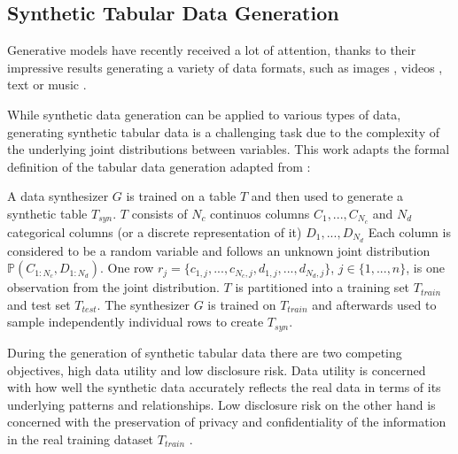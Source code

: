 \subsection{Synthetic Tabular Data Generation}
\label{sec: synthetic tabular data generation}

Generative models have recently received a lot of attention, thanks to their impressive results generating a variety of data formats, 
such as images \cite{ho2020DenoisingDiffusionProbabilistic, dhariwal2021DiffusionModelsBeat, rombach2022HighResolutionImageSynthesis}, videos \cite{ho2022VideoDiffusionModels, Gen1Runway}, text \cite{radfordImprovingLanguageUnderstanding, 2022ChatGPTOptimizingLanguage} or music \cite{agostinelli2023MusicLMGeneratingMusic, martirosRiffusion}.

While synthetic data generation can be applied to various types of data, generating synthetic tabular data is a challenging task due to the complexity of the underlying joint distributions between variables.
This work adapts the formal definition of the tabular data generation adapted from \cite[p. 2]{xu2019ModelingTabularData}:

\begin{displayquote}
    A data synthesizer $G$ is trained on a table $T$ and then used to generate a synthetic table $T_{syn}$. %
    $T$ consists of $N_c$ continuos columns ${C_1, ..., C_{N_c}}$ and $N_d$ categorical columns (or a discrete representation of it) ${D_1, ..., D_{N_d}}$
    Each column is considered to be a random variable and follows an unknown joint distribution $\mathbb{P}(C_{1:N_c},D_{1:N_d})$.
    One row $r_j=\{c_{1,j}, ...,c_{N_c,j}, d_{1,j}, ...,d_{N_d,j}\}$, $j \in\{1, ..., n\}$, is one observation from the joint distribution.
    $T$ is partitioned into a training set $T_{train}$ and test set $T_{test}$. 
    The synthesizer $G$ is trained on $T_{train}$ and afterwards used to sample independently individual rows to create $T_{syn}$.
\end{displayquote}

During the generation of synthetic tabular data there are two competing objectives, high data utility and low disclosure risk.
Data utility is concerned with how well the synthetic data accurately reflects the real data in terms of its underlying patterns and relationships.
Low disclosure risk on the other hand is concerned with the preservation of privacy and confidentiality of the information in the real training dataset $T_{train}$ \cite{little2021GenerativeAdversarialNetworksa}. 

